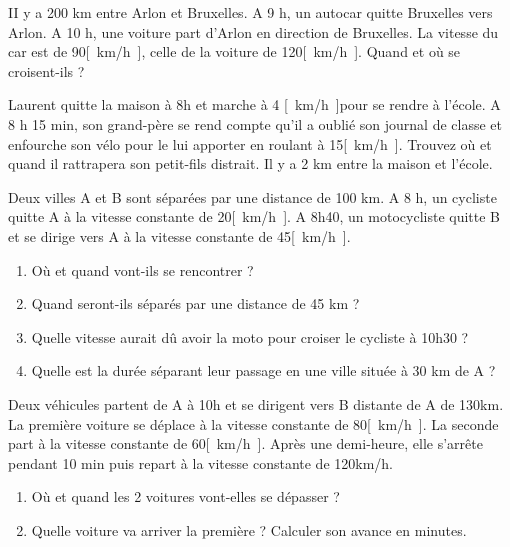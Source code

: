 \begin{exercise}
    II y a 200 km entre Arlon et Bruxelles. A 9 h, un autocar quitte Bruxelles vers Arlon. A 10 h, une voiture  part d'Arlon en direction de Bruxelles. La vitesse du car est de 90\unit{[km/h]}, celle de la voiture de 120\unit{[km/h]}. Quand et où se croisent-ils ?
\end{exercise}
\begin{solution}
\end{solution}

\begin{exercise}
    Laurent quitte la maison à 8h et marche à 4 \unit{[km/h]}pour se rendre à l'école. A 8 h 15 min, son grand-père se rend compte qu'il a oublié son journal de classe et enfourche son vélo pour le lui apporter en roulant à 15\unit{[km/h]}. Trouvez où et quand il rattrapera son petit-fils distrait. Il y a 2 km entre la maison et l'école.
\end{exercise}
\begin{solution}
\end{solution}

\begin{exercise}
    Deux villes A et B sont séparées par une distance de 100 km. A 8 h, un cycliste quitte A à la vitesse constante de 20\unit{[km/h]}. A 8h40, un motocycliste quitte B et se dirige vers A à la vitesse constante de 45\unit{[km/h]}.
    \begin{enumerate}[label=\alph*)]
        \item Où et quand vont-ils se rencontrer ?
        \item Quand seront-ils séparés par une distance de 45 km ?
        \item Quelle vitesse aurait dû avoir la moto pour croiser le cycliste à 10h30 ?
        \item Quelle est la durée séparant leur passage en une ville située à 30 km de A ?
    \end{enumerate}
\end{exercise}

\begin{exercise}
    Deux véhicules partent de A à 10h et se dirigent vers B distante de A de 130km. La première voiture se déplace à la vitesse constante de 80\unit{[km/h]}. La seconde part à la vitesse constante de 60\unit{[km/h]}. Après une demi-heure, elle s'arrête pendant 10 min puis repart à la vitesse constante de 120km/h.
    \begin{enumerate}[label=\alph*)]
        \item Où et quand les 2 voitures vont-elles se dépasser ?
        \item Quelle voiture va arriver la première ? Calculer son avance en minutes.
    \end{enumerate}
\end{exercise}

